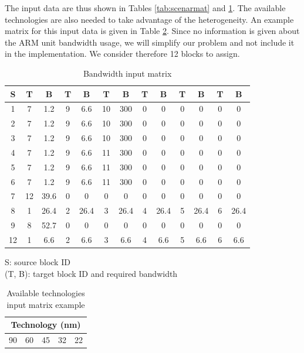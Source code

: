 The input data are thus shown in Tables \ref{tab:scenarmat} and \ref{tab:bwmatrix}. The available technologies are also needed to take advantage of the heterogeneity. An example matrix for this input data is given in Table \ref{tab:tech}. Since no information is given about the ARM unit bandwidth usage, we will simplify our problem and not include it in the implementation. We consider therefore 12 blocks to assign.

\begin{table}[pt!]
\caption{Bandwidth input matrix}
\begin{center}
\begin{scriptsize}
\begin{tabular}{|c|c|c|c|c|c|c|c|c|c|c|c|c|}
\hline S & T & B & T & B & T & B & T & B & T & B & T & B \\
\hline 1 & 7 & 1.2 & 9 & 6.6 & 10 & 300 & 0 & 0 & 0 & 0 & 0 & 0\\
2 & 7 & 1.2 & 9 & 6.6 & 10 & 300 & 0 & 0 & 0 & 0 & 0 & 0\\
3 & 7 & 1.2 & 9 & 6.6 & 10 & 300 & 0 & 0 & 0 & 0 & 0 & 0\\
4 & 7 & 1.2 & 9 & 6.6 & 11 & 300 & 0 & 0 & 0 & 0 & 0 & 0\\
5 & 7 & 1.2 & 9 & 6.6 & 11 & 300 & 0 & 0 & 0 & 0 & 0 & 0\\
6 & 7 & 1.2 & 9 & 6.6 & 11 & 300 & 0 & 0 & 0 & 0 & 0 & 0\\
7 & 12 & 39.6 & 0 & 0 & 0 & 0 & 0 & 0 & 0 & 0 & 0 & 0\\
8 & 1 & 26.4 & 2 & 26.4 & 3 & 26.4 & 4 & 26.4 & 5 & 26.4 & 6 & 26.4\\
9 & 8 & 52.7 & 0 & 0 & 0 & 0 & 0 & 0 & 0 & 0 & 0 & 0\\
12 & 1 & 6.6 & 2 & 6.6 & 3 & 6.6 & 4 & 6.6 & 5 & 6.6 & 6 & 6.6\\
\hline
\end{tabular}
\end{scriptsize}
\end{center}
\begin{center}
S: source block ID\\
(T, B): target block ID and required bandwidth
\end{center}
\label{tab:bwmatrix}
\end{table}

\begin{table}[p]
\caption{Available technologies input matrix example}
\begin{center}
\begin{tabular}{|c|c|c|c|c|}
\hline \multicolumn{5}{|c|}{Technology (nm)}\\
\hline 90 & 60 & 45 & 32 & 22\\
\hline
\end{tabular}
\end{center}
\label{tab:tech}
\end{table}

